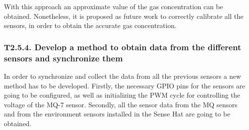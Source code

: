 

With this approach an approximate value of the gas concentration can be obtained. Nonetheless, it is proposed as future work to correctly calibrate all the sensors, in order to obtain the accurate gas concentration.


\subsubsection{T2.5.4. Develop a method to obtain data from the different sensors and synchronize them}

In order to synchronize and collect the data from all the previous sensors a new method has to be developed. Firstly, the necessary GPIO pins for the sensors are going to be configured, as well as initializing the \ac{PWM} cycle for controlling the voltage of the MQ-7 sensor. Secondly, all the sensor data from the MQ sensors and from the environment sensors installed in the Sense Hat \cite{SenseHAT} are going to be obtained.

